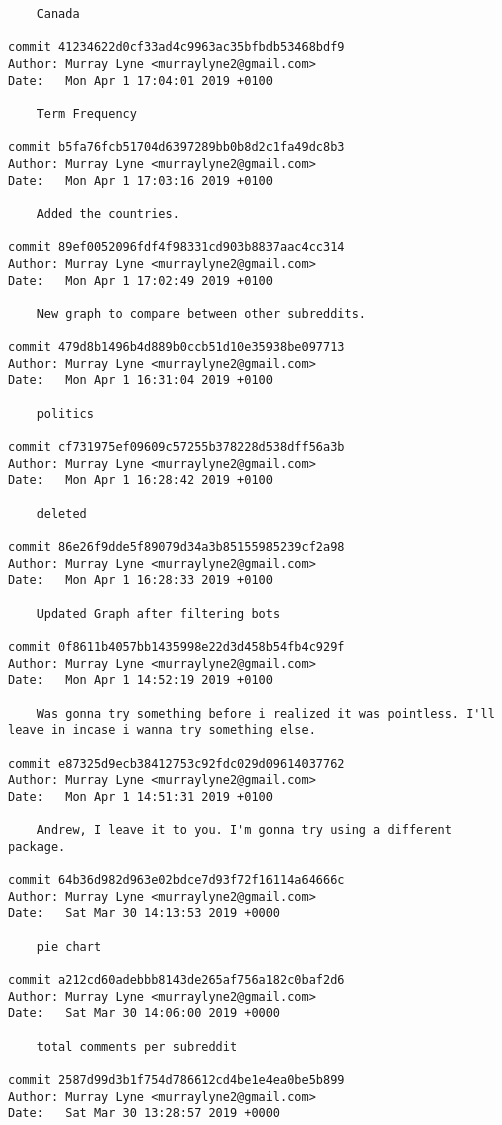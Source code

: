 \begin{lstlisting}
    Canada

commit 41234622d0cf33ad4c9963ac35bfbdb53468bdf9
Author: Murray Lyne <murraylyne2@gmail.com>
Date:   Mon Apr 1 17:04:01 2019 +0100

    Term Frequency

commit b5fa76fcb51704d6397289bb0b8d2c1fa49dc8b3
Author: Murray Lyne <murraylyne2@gmail.com>
Date:   Mon Apr 1 17:03:16 2019 +0100

    Added the countries.

commit 89ef0052096fdf4f98331cd903b8837aac4cc314
Author: Murray Lyne <murraylyne2@gmail.com>
Date:   Mon Apr 1 17:02:49 2019 +0100

    New graph to compare between other subreddits.

commit 479d8b1496b4d889b0ccb51d10e35938be097713
Author: Murray Lyne <murraylyne2@gmail.com>
Date:   Mon Apr 1 16:31:04 2019 +0100

    politics

commit cf731975ef09609c57255b378228d538dff56a3b
Author: Murray Lyne <murraylyne2@gmail.com>
Date:   Mon Apr 1 16:28:42 2019 +0100

    deleted

commit 86e26f9dde5f89079d34a3b85155985239cf2a98
Author: Murray Lyne <murraylyne2@gmail.com>
Date:   Mon Apr 1 16:28:33 2019 +0100

    Updated Graph after filtering bots

commit 0f8611b4057bb1435998e22d3d458b54fb4c929f
Author: Murray Lyne <murraylyne2@gmail.com>
Date:   Mon Apr 1 14:52:19 2019 +0100

    Was gonna try something before i realized it was pointless. I'll leave in incase i wanna try something else.

commit e87325d9ecb38412753c92fdc029d09614037762
Author: Murray Lyne <murraylyne2@gmail.com>
Date:   Mon Apr 1 14:51:31 2019 +0100

    Andrew, I leave it to you. I'm gonna try using a different package.

commit 64b36d982d963e02bdce7d93f72f16114a64666c
Author: Murray Lyne <murraylyne2@gmail.com>
Date:   Sat Mar 30 14:13:53 2019 +0000

    pie chart

commit a212cd60adebbb8143de265af756a182c0baf2d6
Author: Murray Lyne <murraylyne2@gmail.com>
Date:   Sat Mar 30 14:06:00 2019 +0000

    total comments per subreddit

commit 2587d99d3b1f754d786612cd4be1e4ea0be5b899
Author: Murray Lyne <murraylyne2@gmail.com>
Date:   Sat Mar 30 13:28:57 2019 +0000


\end{lstlisting}
